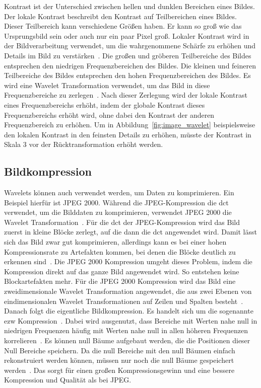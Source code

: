 \documentclass[12pt, a4paper, ngerman]{article}
\begin{document}
Kontrast ist der Unterschied zwischen hellen
und dunklen Bereichen eines Bildes.
Der lokale Kontrast beschreibt
den Kontrast auf Teilbereichen eines Bildes.
Dieser Teilbereich kann verschiedene Größen haben.
Er kann so groß wie das Ursprungsbild sein
oder auch nur ein paar Pixel groß.
Lokaler Kontrast wird in der Bildverarbeitung verwendet, um
die wahrgenommene Schärfe zu erhöhen
und Details im Bild zu verstärken~\cite[S.108]{dt_manual}.
Die großen und gröberen Teilbereiche des Bildes
entsprechen den niedrigen Frequenzbereichen des Bildes.
Die kleinen und feineren Teilbereiche des Bildes
entsprechen den hohen Frequenzbereichen des Bildes.
Es wird eine Wavelet Transformation verwendet, um das Bild
in diese Frequenzbereiche zu zerlegen~\cite[S.107]{dt_manual}.
Nach dieser Zerlegung wird der lokale Kontrast
eines Frequenzbereichs erhöht,
indem der globale Kontrast dieses Frequenzbereichs erhöht wird,
ohne dabei den Kontrast der anderen Frequenzbereich zu erhöhen.
Um in Abbildung~\ref{fig:image_wavelet} beispielsweise
den lokalen Kontrast in den feinsten Details zu erhöhen,
müsste der Kontrast in Skala 3 vor der Rücktransformation erhöht werden.

\subsection{Bildkompression}

Wavelets können auch verwendet werden, um Daten zu komprimieren.
Ein Beispiel hierfür ist JPEG 2000.
Während die JPEG-Kompression die \ac{dct} verwendet,
um die Bilddaten zu komprimieren,
verwendet JPEG 2000 die Wavelet Transformation~\cite[S.1]{jpeg2000}.
Für die \ac{dct} der JPEG-Kompression wird das Bild zuerst in kleine Blöcke zerlegt,
auf die dann die \ac{dct} angewendet wird.
Damit lässt sich das Bild zwar gut komprimieren,
allerdings kann es bei einer hohen Kompressionsrate zu Artefakten kommen,
bei denen die Blöcke deutlich zu erkennen sind~\cite[S.13]{jpeg2000}.
Die JPEG 2000 Kompression umgeht dieses Problem,
indem die Kompression direkt auf das ganze Bild angewendet wird.
So entstehen keine Blockartefakten mehr.
Für die JPEG 2000 Kompression wird das Bild 
eine zweidimensionale Wavelet Transformation angewendet,
die aus zwei Ebenen von eindimensionalen 
Wavelet Transformationen auf Zeilen und Spalten besteht~\cite[S.2]{jpeg2000}.
Danach folgt die eigentliche Bildkompression.
Es handelt sich um die sogenannte \ac{ezw} Kompression~\cite[S.1]{jpeg2000}.
Dabei wird ausgenutzt, dass Bereiche mit Werten nahe null in niedrigen Frequenzen 
häufig mit Werten nahe null in allen höheren Frequenzen korrelieren~\cite[S.9]{jpeg2000}.
Es können null Bäume aufgebaut werden, die die Positionen dieser Null Bereiche speichern.
Da die null Bereiche mit den null Bäumen einfach rekonstruiert werden können,
müssen nur noch die null Bäume gespeichert werden~\cite[S.10]{jpeg2000}.
Das sorgt für einen großen Kompressionsgewinn
und eine bessere Kompression und Qualität als bei JPEG.
\end{document}

